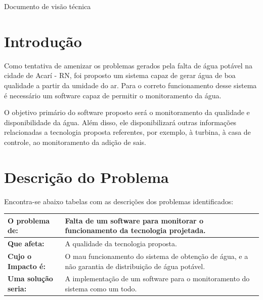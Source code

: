  
 
%
 
 
 \textual
\begin{center}
 {\large Documento de visão técnica}\\[0.2cm]
 \end{center}


\section*{Introdução}
Como tentativa de amenizar os problemas gerados pela falta de água potável na cidade de Acarí - RN, foi proposto um sistema capaz de gerar água de boa qualidade a partir da umidade do ar. Para o correto funcionamento desse sistema é necessário um software capaz de permitir o monitoramento da água.

O objetivo primário do software proposto será o monitoramento da qualidade e disponibilidade da água. Além disso, ele disponibilizará outras informações relacionadas a tecnologia proposta referentes, por exemplo, à turbina, à casa de controle, ao monitoramento da adição de sais.

\section*{Descrição do Problema}
Encontra-se abaixo tabelas com as descrições dos problemas identificados:
\begin{table}[!h]
\centering
\begin{tabular}{|p{4cm}|p{10cm}|}\hline
\textbf{O problema de:}&Falta de um software para monitorar o funcionamento da tecnologia projetada.\\ \hline
\textbf{Que afeta:}&A qualidade da tecnologia proposta.\\ \hline
\textbf{Cujo o Impacto é:}&	O mau funcionamento do sistema de obtenção de água, e a não garantia de distribuição de água potável.\\ \hline
\textbf{Uma solução seria:}&	A implementação de um software para o monitoramento do sistema como um todo.\\ \hline

\end{tabular}
\end{table}

